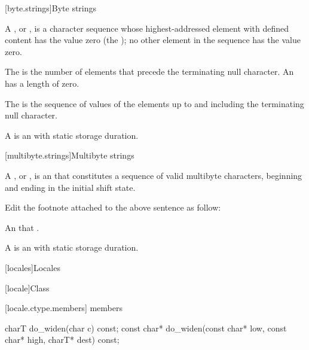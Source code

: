 \documentclass{wg21}
\begin{document}
[byte.strings]{Byte strings}

%
\pnum
A ,
or \ntbs{},
is a character sequence whose highest-addressed element
with defined content has the value zero
(the );
no other element in the sequence has the value zero.

\pnum
The 
is the number of elements that
precede the terminating null character.
An 
has a length of zero.

\pnum
The 
is the sequence of values of the
elements up to and including the terminating null character.

\pnum
A 
is an \ntbs{} with
static storage duration.

[multibyte.strings]{Multibyte strings}

%
\pnum
A ,
or \ntmbs{},
is an \ntbs{} that constitutes a
sequence of valid multibyte characters, beginning and ending in the initial
shift state.

\begin{quoteblock}
Edit the footnote attached to the above sentence as follow:
\begin{quoteblock}
An \ntbs{} that .
\end{quoteblock}
\end{quoteblock}

\pnum
A 
is an \ntmbs{} with static storage duration.


[locales]{Locales}

[locale]{Class }

[locale.ctype.members]{ members}

%
\begin{itemdecl}
    charT        do_widen(char c) const;
    const char*  do_widen(const char* low, const char* high, charT* dest) const;
\end{itemdecl}
\end{document}

